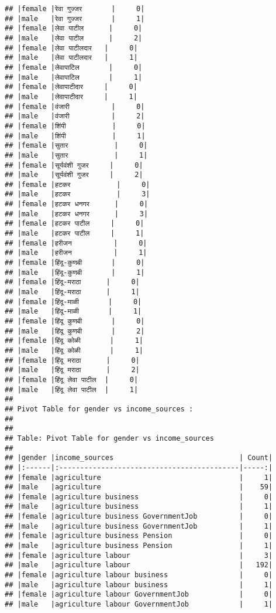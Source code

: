 \documentclass[
]{article}
\begin{document}
\begin{verbatim}
## |female |रेवा गुज्जर       |     0|
## |male   |रेवा गुज्जर       |     1|
## |female |लेवा पाटील      |     0|
## |male   |लेवा पाटील      |     2|
## |female |लेवा पाटीलदार   |     0|
## |male   |लेवा पाटीलदार   |     1|
## |female |लेवापाटिल       |     0|
## |male   |लेवापाटिल       |     1|
## |female |लेवापाटीदार     |     0|
## |male   |लेवापाटीदार     |     1|
## |female |वंजारी          |     0|
## |male   |वंजारी          |     2|
## |female |शिंपी           |     0|
## |male   |शिंपी           |     1|
## |female |सुतार           |     0|
## |male   |सुतार           |     1|
## |female |सूर्यवंशी गुजर     |     0|
## |male   |सूर्यवंशी गुजर     |     2|
## |female |हटकर           |     0|
## |male   |हटकर           |     3|
## |female |हटकर धनगर      |     0|
## |male   |हटकर धनगर      |     3|
## |female |हटकर पाटील     |     0|
## |male   |हटकर पाटील     |     1|
## |female |हरीजन          |     0|
## |male   |हरीजन          |     1|
## |female |हिंदू-कुणबी       |     0|
## |male   |हिंदू-कुणबी       |     1|
## |female |हिंदू-मराठा      |     0|
## |male   |हिंदू-मराठा      |     1|
## |female |हिंदू-माळी       |     0|
## |male   |हिंदू-माळी       |     1|
## |female |हिंदू कुणबी       |     0|
## |male   |हिंदू कुणबी       |     2|
## |female |हिंदू कोळी       |     1|
## |male   |हिंदू कोळी       |     1|
## |female |हिंदू मराठा      |     0|
## |male   |हिंदू मराठा      |     2|
## |female |हिंदू लेवा पाटील  |     0|
## |male   |हिंदू लेवा पाटील  |     1|
## 
## Pivot Table for gender vs income_sources :
## 
## 
## Table: Pivot Table for gender vs income_sources
## 
## |gender |income_sources                              | Count|
## |:------|:-------------------------------------------|-----:|
## |female |agriculture                                 |     1|
## |male   |agriculture                                 |    59|
## |female |agriculture business                        |     0|
## |male   |agriculture business                        |     1|
## |female |agriculture business GovernmentJob          |     0|
## |male   |agriculture business GovernmentJob          |     1|
## |female |agriculture business Pension                |     0|
## |male   |agriculture business Pension                |     1|
## |female |agriculture labour                          |     3|
## |male   |agriculture labour                          |   192|
## |female |agriculture labour business                 |     0|
## |male   |agriculture labour business                 |     1|
## |female |agriculture labour GovernmentJob            |     0|
## |male   |agriculture labour GovernmentJob            |     1|

\end{verbatim}
\end{document}
